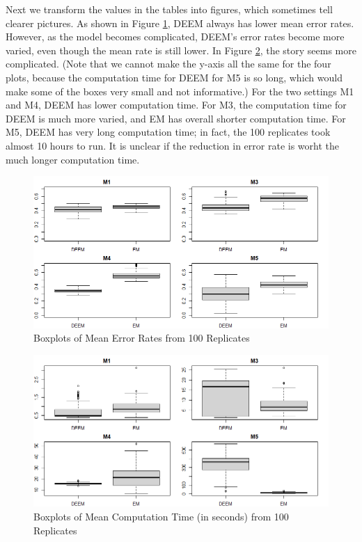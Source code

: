 \documentclass[11pt]{article}
\begin{document}
Next we transform the values in the tables into figures, which sometimes tell clearer pictures. As shown in Figure \ref{fig:err}, DEEM always has lower mean error rates. However, as the model becomes complicated, DEEM's error rates become more varied, even though the mean rate is still lower. In Figure \ref{fig:time}, the story seems more complicated. (Note that we cannot make the y-axis all the same for the four plots, because the computation time for DEEM for M5 is so long, which would make some of the boxes very small and not informative.) For the two settings M1 and M4, DEEM has lower computation time. For M3, the computation time for DEEM is much more varied, and EM has overall shorter computation time. For M5, DEEM has very long computation time; in fact, the 100 replicates took almost 10 hours to run. It is unclear if the reduction in error rate is worht the much longer computation time.

\begin{figure}[H]
    \centering
    \includegraphics[width = 16 cm]{sim_error.png}
    \caption{Boxplots of Mean Error Rates from 100 Replicates}
    \label{fig:err}
\end{figure}

\begin{figure}[H]
    \centering
    \includegraphics[width = 16 cm]{sim_time.png}
    \caption{Boxplots of Mean Computation Time (in seconds) from 100 Replicates}
    \label{fig:time}
\end{figure}
\end{document}

